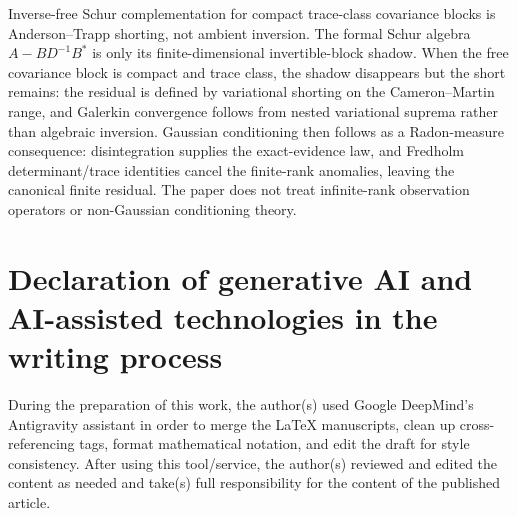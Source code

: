 \documentclass[preprint,12pt]{elsarticle}
\theoremstyle{plain}
\theoremstyle{definition}
\theoremstyle{remark}
\begin{document}
    Inverse-free Schur complementation for compact trace-class covariance blocks
    is Anderson--Trapp shorting, not ambient inversion.  The formal Schur algebra
    $A-BD^{-1}B^*$ is only its finite-dimensional invertible-block shadow.
    When the free covariance block is compact and trace class, the shadow
    disappears but the short remains: the residual is defined by variational
    shorting on the Cameron--Martin range, and Galerkin convergence follows
    from nested variational suprema rather than algebraic inversion.  Gaussian
    conditioning then follows as a Radon-measure consequence:
    disintegration supplies the exact-evidence law, and Fredholm
    determinant/trace identities cancel the finite-rank anomalies, leaving the
    canonical finite residual.  The paper does not treat infinite-rank
    observation operators or non-Gaussian conditioning theory.

    \section*{Declaration of generative AI and AI-assisted technologies in the writing process}

    During the preparation of this work, the author(s) used Google DeepMind's Antigravity assistant in order to merge the LaTeX manuscripts, clean up cross-referencing tags, format mathematical notation, and edit the draft for style consistency. After using this tool/service, the author(s) reviewed and edited the content as needed and take(s) full responsibility for the content of the published article.

    
    

    \appendix

    
\end{document}
